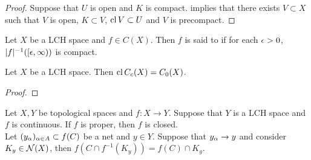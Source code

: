 \documentclass{book}
\begin{document}
\begin{proof}
	Suppose that $U$ is open and $K$ is compact.  implies that there exists $V \subset X$ such that $V$ is open, $K \subset V$, $\operatorname{cl} V \subset U$ and $V$ is precompact. 
\end{proof}

\begin{defn}
	Let $X$ be a LCH space and $f \in C(X)$. Then $f$ is said to  if for each $\epsilon >0$, $|f|^{-1}([\epsilon, \infty))$ is compact.
\end{defn}

\begin{ex} 
	Let $X$ be a LCH space. Then $\operatorname{cl} C_c(X) = C_0(X)$. 
\end{ex}

\begin{proof}
\end{proof}

	
\begin{ex}
	Let $X, Y$ be topological spaces and $f: X \rightarrow Y$. Suppose that $Y$ is a LCH space and $f$ is continuous. If $f$ is proper, then $f$ is closed. \\
	 Let $(y_{\alpha})_{\alpha \in A} \subset f(C)$ be a net and $y \in Y$. Suppose that $y_{\alpha} \rightarrow y$ and consider $K_y \in \mathcal{N}(X)$, then $f(C \cap f^{-1}(K_y)) = f(C) \cap K_{y}$.
\end{ex}
\end{document}
